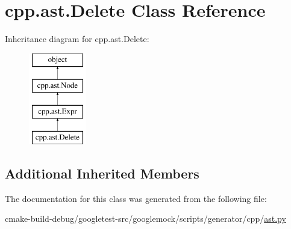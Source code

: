 \hypertarget{classcpp_1_1ast_1_1Delete}{}\section{cpp.\+ast.\+Delete Class Reference}
\label{classcpp_1_1ast_1_1Delete}
Inheritance diagram for cpp.\+ast.\+Delete\+:\begin{figure}[H]
\begin{center}
\leavevmode
\includegraphics[height=4.000000cm]{classcpp_1_1ast_1_1Delete}
\end{center}
\end{figure}
\subsection*{Additional Inherited Members}


The documentation for this class was generated from the following file\+:\begin{DoxyCompactItemize}
\item 
cmake-\/build-\/debug/googletest-\/src/googlemock/scripts/generator/cpp/\mbox{\hyperlink{ast_8py}{ast.\+py}}\end{DoxyCompactItemize}
